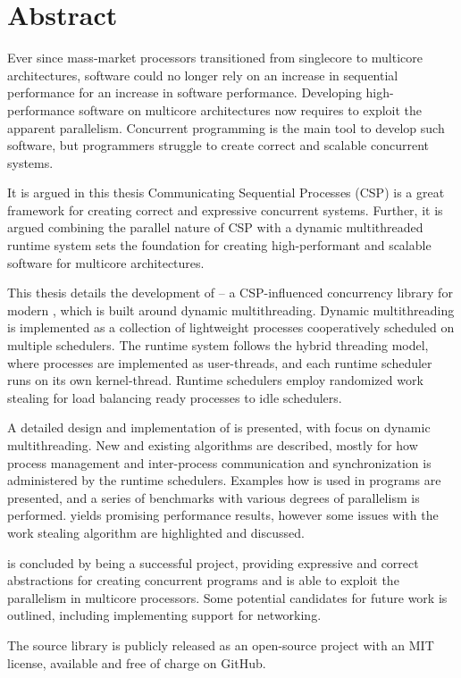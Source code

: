 
\newpage
{}
\section*{Abstract}


Ever since mass\hyp{}market processors transitioned from singlecore to multicore architectures, software could no longer rely on an increase in sequential performance for an increase in software performance. Developing high\hyp{}performance software on multicore architectures now requires to exploit the apparent parallelism. Concurrent programming is the main tool to develop such software, but programmers struggle to create correct and scalable concurrent systems.

It is argued in this thesis Communicating Sequential Processes (CSP) is a great framework for creating correct and expressive concurrent systems. Further, it is argued combining the parallel nature of CSP with a dynamic multithreaded runtime system sets the foundation for creating high\hyp{}performant and scalable software for multicore architectures.

This thesis details the development of \Proxc{} -- a CSP\hyp{}influenced concurrency library for modern \Cpp{}, which is built around dynamic multithreading. Dynamic multithreading is implemented as a collection of lightweight processes cooperatively scheduled on multiple schedulers. The runtime system follows the hybrid threading model, where processes are implemented as user\hyp{}threads, and each runtime scheduler runs on its own kernel\hyp{}thread. Runtime schedulers employ randomized work stealing for load balancing ready processes to idle schedulers.

A detailed design and implementation of \Proxc{} is presented, with focus on dynamic multithreading. New and existing algorithms are described, mostly for how process management and inter\hyp{}process communication and synchronization is administered by the runtime schedulers. Examples how \Proxc{} is used in \Cpp{} programs are presented, and a series of benchmarks with various degrees of parallelism is performed. \Proxc{} yields promising performance results, however some issues with the work stealing algorithm are highlighted and discussed.

\Proxc{} is concluded by being a successful project, providing expressive and correct abstractions for creating concurrent programs and is able to exploit the parallelism in multicore processors. Some potential candidates for future work is outlined, including implementing support for networking.

The source \Proxc{} library is publicly released as an open\hyp{}source project with an MIT license, available and free of charge on GitHub.

\vfill

\afterpage{\blankpage}
